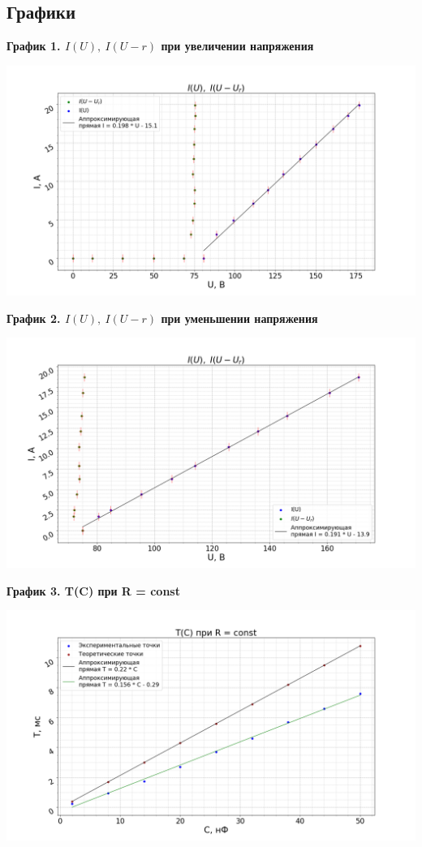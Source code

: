 \documentclass[14pt, a4paper,reqno]{article}
\begin{document}
    \newpage
    \subsection{Графики}

    \textbf{График 1. $I(U),\ I(U - r)$ при увеличении напряжения}
    \begin{center}
        \includegraphics[width=\textwidth]{images/graph_1.png}
    \end{center}

    \textbf{График 2. $I(U),\ I(U - r)$ при уменьшении напряжения}
    \begin{center}
        \includegraphics[width=\textwidth]{images/graph_2.png}
    \end{center}

    \newpage
    \textbf{График 3. T(C) при R = const}
    \begin{center}
        \includegraphics[width=\textwidth]{images/graph_3.png}
    \end{center}
\end{document}
